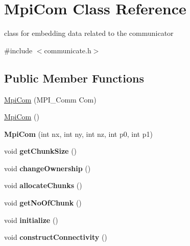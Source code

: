 \hypertarget{structMpiCom}{}\section{Mpi\+Com Class Reference}
\label{structMpiCom}


class for embedding data related to the communicator  




{\ttfamily \#include $<$communicate.\+h$>$}

\subsection*{Public Member Functions}
\begin{DoxyCompactItemize}
\item 
\mbox{\hyperlink{structMpiCom_a5099477d534468bdaffed3bb75e31152}{Mpi\+Com}} (M\+P\+I\+\_\+\+Comm Com)
\item 
\mbox{\hyperlink{structMpiCom_a32daad0b1965c35cdf7485a565cd0d8c}{Mpi\+Com}} ()
\item 
\mbox{\label{structMpiCom_ad53c1f9050c890c3552e6878caca43f2}} 
{\bfseries Mpi\+Com} (int nx, int ny, int nz, int p0, int p1)
\item 
\mbox{\label{structMpiCom_a2e7a74f288b0838d1a24b203b4e78080}} 
void {\bfseries get\+Chunk\+Size} ()
\item 
\mbox{\label{structMpiCom_a346940138300eb16c2b74f74dae6342b}} 
void {\bfseries change\+Ownership} ()
\item 
\mbox{\label{structMpiCom_ac7df8694f98dd05d0438823271d4f0e8}} 
void {\bfseries allocate\+Chunks} ()
\item 
\mbox{\label{structMpiCom_a532458ac72c5930c59afafbd36101db6}} 
void {\bfseries get\+No\+Of\+Chunk} ()
\item 
\mbox{\label{structMpiCom_a2158d7556843141b98ce293444137988}} 
void {\bfseries initialize} ()
\item 
\mbox{\label{structMpiCom_adc08d6425b2e805562e5f741755772d2}} 
void {\bfseries construct\+Connectivity} ()
\item 

\end{DoxyCompactItemize}
